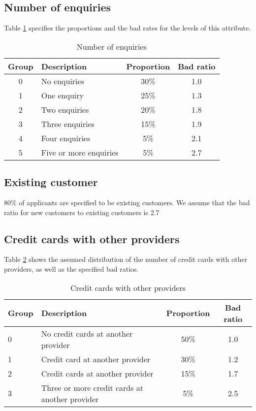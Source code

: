 \documentclass{article}
\theoremstyle{def}
\begin{document}
\subsection{Number of enquiries}

Table \ref{NumEnq_param} specifies the proportions and the bad rates for the levels of this attribute.
\begin{table}[H]%
\caption{Number of enquiries}
\label{NumEnq_param}
\centering
\small
\begin{tabular}{clcc}
\hline
Group & Description & Proportion & Bad ratio \\
\hline
0 & No enquiries & 30\%  & 1.0\\
1 & One enquiry & 25\%  & 1.3\\
2 & Two enquiries & 20\% & 1.8\\
3 & Three enquiries & 15\% & 1.9\\
4 & Four enquiries & 5\% & 2.1\\
5 & Five or more enquiries & 5\% & 2.7\\
\hline
\end{tabular}
\end{table}   

\subsection{Existing customer}

$80\%$ of applicants are specified to be existing customers. We assume that the bad ratio for new customers to existing customers is 2.7

\subsection{Credit cards with other providers}

Table \ref{CCOth_param1} shows the assumed distribution of the number of credit cards with other providers, as well as the specified bad ratios.
\begin{table}[H]%
\caption{Credit cards with other providers}
\label{CCOth_param1}
\centering
\small
\begin{tabular}{llcc}
\hline
Group & Description & Proportion & Bad ratio \\
\hline
0 & No credit cards at another provider & 50\%  & 1.0\\
1 & Credit card at another provider & 30\%  & 1.2\\
2 & Credit cards at another provider & 15\% & 1.7\\
3 & Three or more credit cards at another provider & 5\% & 2.5\\
\hline
\end{tabular}
\end{table}  
\end{document}
